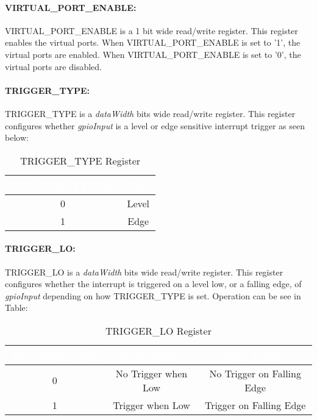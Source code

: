 \paragraph{VIRTUAL\_PORT\_ENABLE:}
VIRTUAL\_PORT\_ENABLE is a 1 bit wide read/write register. This register enables the virtual ports. When VIRTUAL\_PORT\_ENABLE is set to '1', the virtual ports are enabled.
When VIRTUAL\_PORT\_ENABLE is set to '0', the virtual ports are disabled.

\paragraph{TRIGGER\_TYPE:}
TRIGGER\_TYPE is a \textit{dataWidth} bits wide read/write register. This register configures whether \textit{gpioInput} is a level or edge sensitive
interrupt trigger as seen below:
\begin{table}[h]
  \centering
  \begin{tabular}{|c|c|}
      \hline
      \rowcolor{dark-gray}  %
      \textcolor{white}{\textbf{TRIGGER\_TYPE[n]}} & \textcolor{white}{\textbf{Type}} \\ \hline
      0 & Level \\ \hline
      1 & Edge \\ \hline
  \end{tabular}
  \caption{TRIGGER\_TYPE Register}
\end{table}

\newpage

\paragraph{TRIGGER\_LO:}
TRIGGER\_LO is a \textit{dataWidth} bits wide read/write register. This register configures whether the interrupt is triggered on a level low, or a falling edge, 
of \textit{gpioInput} depending on how TRIGGER\_TYPE is set. Operation can be see in Table:
\begin{table}[h]
  \centering
  \begin{tabular}{|c|c|c|}
      \hline
      \rowcolor{dark-gray}  %
      \textcolor{white}{\textbf{TRIGGER\_LO[n]}} & \textcolor{white}{\textbf{Level Trigger}} & \textcolor{white}{\textbf{Edge Trigger}} \\ \hline
      0 & No Trigger when Low & No Trigger on Falling Edge\\ \hline
      1 & Trigger when Low & Trigger on Falling Edge\\ \hline
  \end{tabular}
  \caption{TRIGGER\_LO Register}
\end{table}

